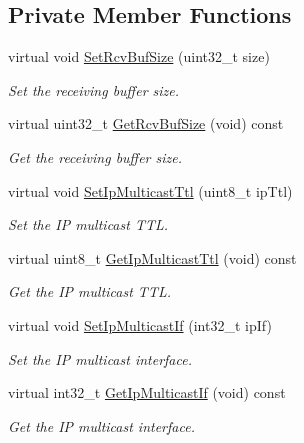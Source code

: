 \subsection*{Private Member Functions}
\begin{DoxyCompactItemize}
\item 
virtual void \hyperlink{classns3_1_1UdpSocketImpl_a002c494bd9a8b8e9283aacce41c081a9}{Set\+Rcv\+Buf\+Size} (uint32\+\_\+t size)
\begin{DoxyCompactList}\small\item\em Set the receiving buffer size. \end{DoxyCompactList}\item 
virtual uint32\+\_\+t \hyperlink{classns3_1_1UdpSocketImpl_a416f9131c40452da19e02d86a8691ffd}{Get\+Rcv\+Buf\+Size} (void) const 
\begin{DoxyCompactList}\small\item\em Get the receiving buffer size. \end{DoxyCompactList}\item 
virtual void \hyperlink{classns3_1_1UdpSocketImpl_aff7e58ad0fc890d358d4f0d8eccddb95}{Set\+Ip\+Multicast\+Ttl} (uint8\+\_\+t ip\+Ttl)
\begin{DoxyCompactList}\small\item\em Set the IP multicast T\+TL. \end{DoxyCompactList}\item 
virtual uint8\+\_\+t \hyperlink{classns3_1_1UdpSocketImpl_af458fecb96042e1be40efa66db348e99}{Get\+Ip\+Multicast\+Ttl} (void) const 
\begin{DoxyCompactList}\small\item\em Get the IP multicast T\+TL. \end{DoxyCompactList}\item 
virtual void \hyperlink{classns3_1_1UdpSocketImpl_addfb5894a849eb136d084d5aac4d10ae}{Set\+Ip\+Multicast\+If} (int32\+\_\+t ip\+If)
\begin{DoxyCompactList}\small\item\em Set the IP multicast interface. \end{DoxyCompactList}\item 
virtual int32\+\_\+t \hyperlink{classns3_1_1UdpSocketImpl_aced96ba1ce213afb754231be7c25510a}{Get\+Ip\+Multicast\+If} (void) const 
\begin{DoxyCompactList}\small\item\em Get the IP multicast interface. \end{DoxyCompactList}\item 

\end{DoxyCompactItemize}
